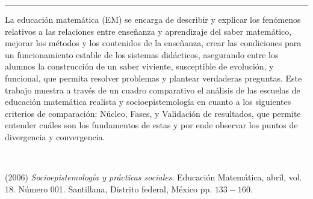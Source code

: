 \begin{titlepage}
\begin{minipage}{0.5\linewidth}
\begin{minipage}{0.45\linewidth}
    \begin{flushright}
        \printauthor
    \end{flushright}
\end{minipage} \hspace{-3pt}
%
\begin{minipage}{0.02\linewidth}
   \color{ptctitle} \rule{1pt}{165pt}
\end{minipage} 
\end{minipage}
\hspace*{-4.5cm}
\begin{minipage}{0.85\linewidth}
\begin{minipage}{0.85\linewidth}
\footnotesize
\vspace{5pt}
    \begin{resumen}
  La educaci\'on matem\'atica (EM) se encarga de describir y explicar los fen\'omenos relativos a las relaciones entre ense\~nanza y aprendizaje del saber matem\'atico, mejorar los m\'etodos y los contenidos de la ense\~nanza, crear las condiciones para un funcionamiento estable de los sistemas did\'acticos, asegurando entre los alumnos la construcci\'on de un saber viviente, susceptible de evoluci\'on, y funcional, que permita resolver problemas y plantear verdaderas preguntas. Este trabajo muestra a trav\'es de un cuadro comparativo el an\'alisis de las escuelas de educaci\'on matem\'atica realista y socioepistemolog\'ia en cuanto a los siguientes criterios de comparaci\'on: N\'ucleo, Fases, y Validaci\'on de resultados, que permite entender cu\'ales son los fundamentos de estas y por ende observar los puntos de divergencia y convergencia.
     \end{resumen}
\end{minipage}
\vspace*{5pt}\\
\footnotesize
%  
    
\end{minipage}
\vspace{5pt}
\begin{thebibliography}{99}
 (2006) {\it Socioepistemolog\'ia y pr\'acticas sociales}. Educaci\'on Matem\'atica, abril, vol. 18. N\'umero 001. Santillana, Distrito federal, M\'exico pp. $133-160$.


\end{thebibliography}
\end{titlepage}
